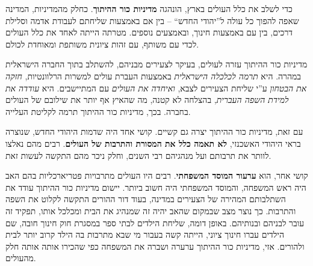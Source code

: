 \documentclass[]{../../../../tex/classes/styledArticle}
\begin{document}
\begin{enumerate}[A.]
		כדי לשלב את כלל העולים בארץ, הונהגה \textbf{מדיניות כור ההיתוך}. כחלק מהמדיניות, המדינה שאפה להפוך כל עולה ל''יהודי החדש`` – בין אם באמצעות שליחתם לעבודת אדמה וסלילת דרכים, בין עם באמצעות חינוך, ובאמצעים נוספים. מטרתה הייתה לאחד את כלל העולים לכדי עם משותף, עם זהות ציונית משותפת ומאוחדת לכולם. 
		
		מדיניות כור ההיתוך עזרה לעולים, בעיקר לצעירים מבניהם, להשתלב בתוך החברה הישראלית במהרה. היא \textit{תרמה לכלכלה הישראלית} באמצעות העברת עולים למשרות הרלוונטיות, \textit{חזקה את הבטחון} ע''י שליחת הצעירים לצבא, \textit{ואיחדה את העולים} עם המתיישבים. היא \textit{עודדה את למידת השפה העברית}, בהצלחה לא קטנה, מה שהאיץ אף יותר את שילובם של העולים בחברה. בכך, מדיניות כור ההיתוך תרמה לקליטת העלייה. 
		
		עם זאת, מדיניות כור ההיתוך יצרה גם קשיים. קושי אחד היה שדמות היהודי החדש, שנוצרה בראי היהודי האשכנזי, \textbf{לא תאמה כלל את המסורת והתרבות של העולים}. רבים מהם נאלצו לוותר את תרבותם ועל מנהגיהם רבי השנים, וחלק ניכר מהם התקשה לעשות זאת. 
		
		קושי אחר, הוא \textbf{ערעור המוסד המשפחתי}. רבים היו העולים מתרבויות פטריארכליות בהם האב היה ראש המשפחה, והמוסד המשפחתי היה חשוב ביותר. יישום מדיניות כור ההיתוך עודד את השתלבותם המהירה של הצעירים במדינה, בעוד דור ההורים התקשה לקלוט את השפה והתרבות. כך נוצר מצב שבמקום שהאב יהיה זה שמנהיג את הבית ומכלכל אותו, תפקיד זה עובר לבניהם ובנותיהם. באופן דומה, שליחת הילדים לבתי ספר במסגרת חוק חינוך חובה, שם הילדים עברו חינוך ציוני, הייתה קשה בעבור מי שבא מתרבות בה הילד קרוב יותר לבית ולהורים. אזי, מדיניות כור ההיתוך ערערה ושברה את המשפחה כפי שהכירו אותה אותה חלק מהעולים. 
		
	\end{enumerate}
	
	
	
	
	
\end{document}
